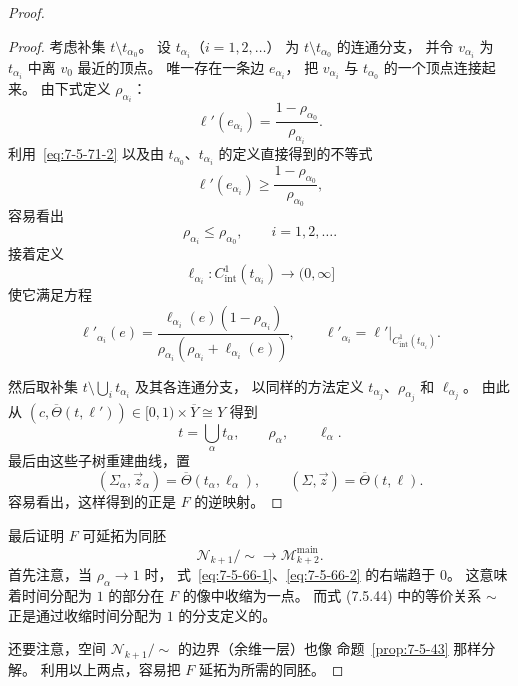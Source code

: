 \begin{proof}
\begin{proof}
考虑补集 $t\setminus t_{\alpha_0}$。
设 $t_{\alpha_i}$（$i=1,2,\ldots$）
为 $t\setminus t_{\alpha_0}$ 的连通分支，
并令 $v_{\alpha_i}$ 为 $t_{\alpha_i}$ 中离 $v_0$ 最近的顶点。
唯一存在一条边 $e_{\alpha_i}$，
把 $v_{\alpha_i}$ 与 $t_{\alpha_0}$ 的一个顶点连接起来。
由下式定义 $\rho_{\alpha_i}$：
\[
\ell'(e_{\alpha_i})
=\frac{1-\rho_{\alpha_0}}{\rho_{\alpha_i}}.
\]
利用~\ref{eq:7-5-71-2} 以及由
$t_{\alpha_0}$、$t_{\alpha_i}$ 的定义直接得到的不等式
\[
\ell'(e_{\alpha_i})
\geq\frac{1-\rho_{\alpha_0}}{\rho_{\alpha_0}},
\]
容易看出
\[
\rho_{\alpha_i}\leq\rho_{\alpha_0},
\qquad i=1,2,\ldots.
\]
接着定义
\[
\ell_{\alpha_i}\colon
C^1_{\mathrm{int}}(t_{\alpha_i})\longrightarrow(0,\infty]
\]
使它满足方程
\[
\ell'_{\alpha_i}(e)
=\frac{\ell_{\alpha_i}(e)(1-\rho_{\alpha_i})}
{\rho_{\alpha_i}
 (\rho_{\alpha_i}+\ell_{\alpha_i}(e))},
\qquad
\ell'_{\alpha_i}
=\ell'|_{C^1_{\mathrm{int}}(t_{\alpha_i})}.
\]

然后取补集
$t\setminus\bigcup_i t_{\alpha_i}$ 及其各连通分支，
以同样的方法定义
$t_{\alpha_j}$、$\rho_{\alpha_j}$ 和 $\ell_{\alpha_j}$。
由此从
$(c,\overline\Theta(t,\ell'))
\in[0,1)\times\overline Y\cong Y$
得到
\[
t=\bigcup_\alpha t_\alpha,
\qquad \rho_\alpha,
\qquad \ell_\alpha.
\]
最后由这些子树重建曲线，置
\[
(\Sigma_\alpha,\vec z_\alpha)
=\overline\Theta(t_\alpha,\ell_\alpha),
\qquad
(\Sigma,\vec z)=\overline\Theta(t,\ell).
\]
容易看出，这样得到的正是 $F$ 的逆映射。
\end{proof}

最后证明 $F$ 可延拓为同胚
\[
\mathcal N_{k+1}/\!\sim
\longrightarrow\mathcal M_{k+2}^{\mathrm{main}}.
\]
首先注意，当 $\rho_\alpha\to1$ 时，
式~\eqref{eq:7-5-66-1}、\eqref{eq:7-5-66-2}
的右端趋于 $0$。
这意味着时间分配为 $1$ 的部分在 $F$ 的像中收缩为一点。
而式 (7.5.44) 中的等价关系 $\sim$
正是通过收缩时间分配为 $1$ 的分支定义的。

还要注意，空间 $\mathcal N_{k+1}/\!\sim$
的边界（余维一层）也像
命题~\ref{prop:7-5-43} 那样分解。
利用以上两点，容易把 $F$ 延拓为所需的同胚。
\end{proof}
